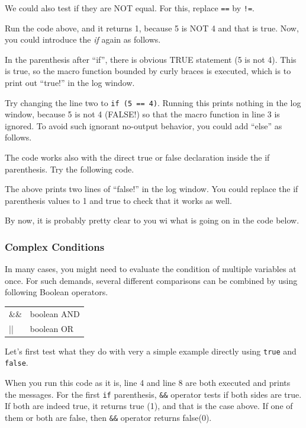 \documentclass[11pt,a4paper,oneside]{report}
\newenvironment{indentCom}%
{\begin{list}{}%
         {\setlength{\leftmargin}{1em}}%
         \item[]%
}
{\end{list}}
\newcommand{\ilcom}[1]{\texttt{\small#1}}
\begin{document}
We could also test if they are NOT equal. For this, replace \ilcom{==} by
\ilcom{!=}.

Run the code above, and it returns 1, because 5 is NOT 4 and that is true. Now,
you could introduce the \textit{if} again as follows.

In the parenthesis after ``if'', there is obvious TRUE statement (5 is not 4).
This is true, so the macro function bounded by curly braces is executed, which is to
print out ``true!'' in the log window.

Try changing the line two to \ilcom{if (5 == 4)}. Running this prints nothing
in the log window, because 5 is not 4 (FALSE!) so that the macro function in
line 3 is ignored. To avoid such ignorant no-output behavior, you could add
``else'' as follows.



The code works also with the direct true or false
declaration inside the if parenthesis. Try the following code.



The above prints two lines of ``false!'' in the log window. You could replace
the if parenthesis values to 1 and true to check that it works as well. 

By now, it is probably pretty clear to you wi what is going on in the code below. 


\subsubsection{Complex Conditions}
In many cases, you might need to evaluate the condition of multiple variables at once. 
For such demands, several different comparisons can be combined by using following Boolean operators. 

\begin{indentCom}
 \begin{tabular*}{0.5\textwidth}{ l l }
\&\& & boolean AND\\
|| & boolean OR\\
\end{tabular*}
\end{indentCom}

Let's first test what they do with very a simple example directly using
\ilcom{true} and \ilcom{false}.

When you run this code as it is, line 4 and line 8 are both executed and prints
the messages. For the first \ilcom{if} parenthesis, \ilcom{\&\&} operator tests if
both sides are true. If both are indeed true, it returns true (1), and that is
the case above. If one of them or both are false, then \ilcom{\&\&}
operator returns false(0). 
\end{document}
